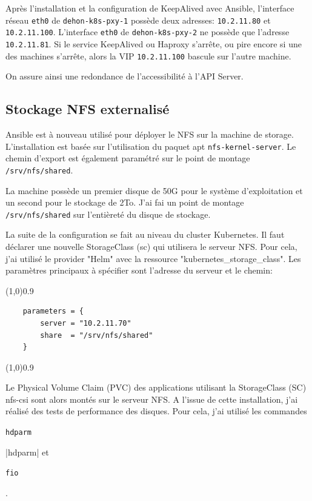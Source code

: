 \documentclass[12pt, a4paper, twoside]{article}
\begin{document}
Après l'installation et la configuration de KeepAlived avec \gls{Ansible}, l'interface réseau \verb|eth0| de \verb|dehon-k8s-pxy-1| possède deux adresses: \verb|10.2.11.80| et \verb|10.2.11.100|.
L'interface \verb|eth0| de \verb|dehon-k8s-pxy-2| ne possède que l'adresse \verb|10.2.11.81|.
Si le service KeepAlived ou Haproxy s'arrête, ou pire encore si une des machines s'arrête, alors la \gls{VIP}  \verb|10.2.11.100| bascule sur l'autre machine.

On assure ainsi une redondance de l'accessibilité à l'\gls{API} Server.

\subsection{Stockage NFS externalisé}
\gls{Ansible} est à nouveau utilisé pour déployer le NFS sur la machine de storage.
L'installation est basée sur l'utilisation du paquet apt \verb|nfs-kernel-server|.
Le chemin d'export est également paramétré sur le point de montage \verb|/srv/nfs/shared|.

La machine possède un premier disque de 50G pour le système d'exploitation et un second pour le stockage de 2To.
J'ai fai un point de montage \verb|/srv/nfs/shared| sur l'entièreté du disque de stockage.

La suite de la configuration se fait au niveau du \gls{cluster} \gls{Kubernetes}.
Il faut déclarer une nouvelle StorageClass (sc) qui utilisera le serveur NFS.
Pour cela, j'ai utilisé le provider "Helm" avec la ressource "kubernetes\_storage\_class".
Les paramètres principaux à spécifier sont l'adresse du serveur et le chemin:
\vspace{-1ex}
\begin{code}
\vspace{-1ex}
\begin{center} 
    \line(1,0){0.9\textwidth} 
\end{center}
\vspace{-1ex}
\begin{verbatim}
    parameters = {
        server = "10.2.11.70"
        share  = "/srv/nfs/shared"
    }
\end{verbatim}
\vspace{-1ex}
\begin{center} 
    \line(1,0){0.9\textwidth} 
\end{center}
\vspace{-1ex}
\end{code}

Le Physical Volume Claim (PVC) des applications utilisant la StorageClass (SC) nfs-csi sont alors montés sur le serveur NFS.
A l'issue de cette installation, j'ai réalisé des tests de performance des disques.
Pour cela, j'ai utilisé les commandes \begin{code}\texttt{hdparm}\end{code}|hdparm| et \begin{code}\texttt{fio}\end{code}.
\end{document}
